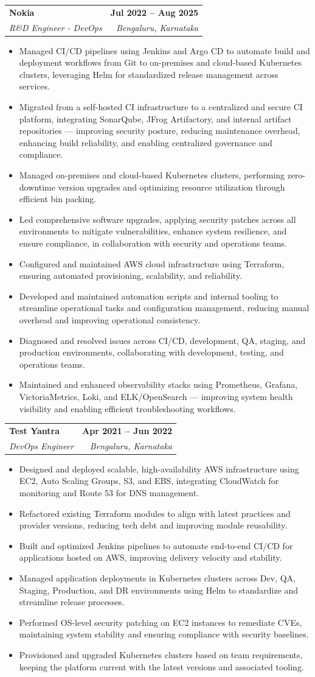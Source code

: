 \documentclass[letterpaper,11pt]{article}
\makeatletter
\newcommand{\resumeItem}[1]{
  \item\small{
    {#1 \vspace{-2pt}}
  }
}
\newcommand{\resumeSubheading}[4]{
  \vspace{-2pt}\item
    \begin{tabular*}{1.0\textwidth}[t]{l@{\extracolsep{\fill}}r}
      \textbf{#1} & \textbf{\small #2} \\
      \textit{\small#3} & \textit{\small #4} \\
    \end{tabular*}\vspace{-7pt}
}
\newcommand{\resumeItemListStart}{\begin{itemize}}
\newcommand{\resumeItemListEnd}{\end{itemize}\vspace{-5pt}}
\makeatother
\begin{document}
    \resumeSubheading
      {Nokia}{Jul 2022 -- Aug 2025}
      {R\&D Engineer - DevOps}{Bengaluru, Karnataka}
      \resumeItemListStart
        \resumeItem{Managed CI/CD pipelines using Jenkins and Argo CD to automate build and deployment workflows from Git to on-premises and cloud-based Kubernetes clusters, leveraging Helm for standardized release management across services.}
        \resumeItem{Migrated from a self-hosted CI infrastructure to a centralized and secure CI platform, integrating SonarQube, JFrog Artifactory, and internal artifact repositories — improving security posture, reducing maintenance overhead, enhancing build reliability, and enabling centralized governance and compliance.}
        \resumeItem{Managed on-premises and cloud-based Kubernetes clusters, performing zero-downtime version upgrades and optimizing resource utilization through efficient bin packing.}
        \resumeItem{Led comprehensive software upgrades, applying security patches across all environments to mitigate vulnerabilities, enhance system resilience, and ensure compliance, in collaboration with security and operations teams.}
        \resumeItem{Configured and maintained AWS cloud infrastructure using Terraform, ensuring automated provisioning, scalability, and reliability.}
        \resumeItem{Developed and maintained automation scripts and internal tooling to streamline operational tasks and configuration management, reducing manual overhead and improving operational consistency.}
        \resumeItem{Diagnosed and resolved issues across CI/CD, development, QA, staging, and production environments, collaborating with development, testing, and operations teams.}
        \resumeItem{Maintained and enhanced observability stacks using Prometheus, Grafana, VictoriaMetrics, Loki, and ELK/OpenSearch — improving system health visibility and enabling efficient troubleshooting workflows.}
      \resumeItemListEnd

    \resumeSubheading
      {Test Yantra}{Apr 2021 -- Jun 2022}
      {DevOps Engineer}{Bengaluru, Karnataka}
      \resumeItemListStart
        \resumeItem{Designed and deployed scalable, high-availability AWS infrastructure using EC2, Auto Scaling Groups, S3, and EBS, integrating CloudWatch for monitoring and Route 53 for DNS management.}
        \resumeItem{Refactored existing Terraform modules to align with latest practices and provider versions, reducing tech debt and improving module reusability.}
        \resumeItem{Built and optimized Jenkins pipelines to automate end-to-end CI/CD for applications hosted on AWS, improving delivery velocity and stability.}
        \resumeItem{Managed application deployments in Kubernetes clusters across Dev, QA, Staging, Production, and DR environments using Helm to standardize and streamline release processes.}
        \resumeItem{Performed OS-level security patching on EC2 instances to remediate CVEs, maintaining system stability and ensuring compliance with security baselines.}
        \resumeItem{Provisioned and upgraded Kubernetes clusters based on team requirements, keeping the platform current with the latest versions and associated tooling.}
      \resumeItemListEnd
\end{document}
